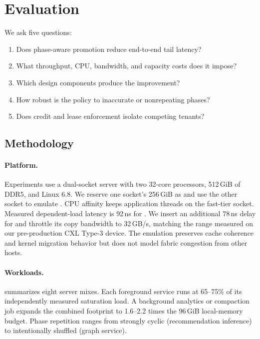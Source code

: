 \section{Evaluation}
\label{sec:evaluation}

We ask five questions:

\begin{enumerate}
  \item Does phase-aware promotion reduce end-to-end tail latency?
  \item What throughput, CPU, bandwidth, and capacity costs does it impose?
  \item Which design components produce the improvement?
  \item How robust is the policy to inaccurate or nonrepeating phases?
  \item Does credit and lease enforcement isolate competing tenants?
\end{enumerate}

\subsection{Methodology}

\paragraph{Platform.}
Experiments use a dual-socket server with two 32-core processors, 512\,GiB of
DDR5, and Linux 6.8.  We reserve one socket's 256\,GiB as \fast and use the
other socket to emulate \slow.  CPU affinity keeps application threads on the
fast-tier socket.  Measured dependent-load latency is 92\,ns for \fast.  We
insert an additional 78\,ns delay for \slow and throttle its copy bandwidth to
32\,GB/s, matching the range measured on our pre-production CXL Type-3 device.
The emulation preserves cache coherence and kernel migration behavior but does
not model fabric congestion from other hosts.

\paragraph{Workloads.}
 summarizes eight server mixes.  Each foreground service
runs at 65--75\% of its independently measured saturation load.  A background
analytics or compaction job expands the combined footprint to 1.6--2.2 times
the 96\,GiB local-memory budget.  Phase repetition ranges from strongly cyclic
(recommendation inference) to intentionally shuffled (graph service).

